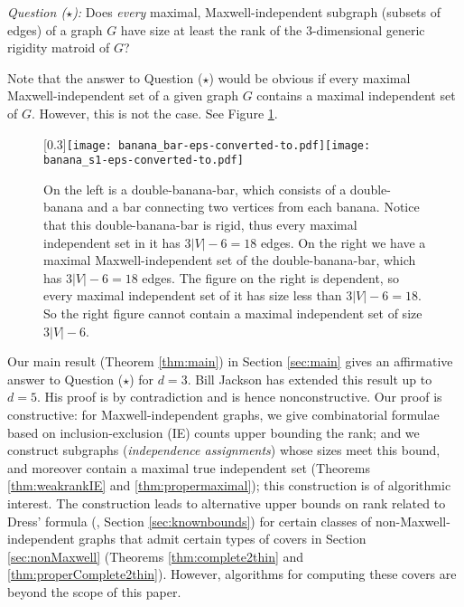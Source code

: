 \documentclass[10pt]{article}
\begin{document}
\medskip
{\em Question ($\star$):}
Does {\it every} maximal, Maxwell-independent subgraph (subsets of edges) of a graph  $G$ have size at least the rank of the $3$-dimensional generic rigidity matroid of $G$?

Note that the answer to Question ($\star$) would be obvious if every maximal Maxwell-independent set of a given graph $G$ contains a maximal independent set of $G$. However, this is not the case. See Figure \ref{fig:bananaBar}.

\begin{center}
\begin{figure}[!h]
\begin{center}
\scalebox{0.3}[0.3]{\texttt{[image: banana\_bar-eps-converted-to.pdf]}\texttt{[image: banana\_s1-eps-converted-to.pdf]} }
\end{center}
\caption{On the left is a double-banana-bar, which consists of a double-banana and a bar connecting two vertices from each banana. Notice that this double-banana-bar is rigid, thus every maximal independent set in it has $3|V|-6=18$ edges. On the right we have a maximal Maxwell-independent set of the double-banana-bar, which has $3|V|-6=18$ edges. The figure on the right is dependent, so every maximal independent set of it has size less than $3|V|-6=18$. So the right figure cannot contain a maximal independent set of size $3|V|-6$. }\label{fig:bananaBar}
\end{figure}
\end{center}

\medskip
\noindent
Our main result (Theorem \ref{thm:main}) in Section \ref{sec:main} gives an affirmative answer to Question ($\star$) for $d=3$. Bill Jackson \cite{JacksonBound2011} has extended this result up to $d=5$. His proof is by contradiction and is hence nonconstructive. Our proof is constructive: for Maxwell-independent graphs, we give combinatorial formulae based on inclusion-exclusion (IE) counts upper bounding the rank; and we construct subgraphs ({\em independence assignments}) whose sizes meet this bound, and moreover contain a maximal true independent set (Theorems \ref{thm:weakrankIE} and \ref{thm:propermaximal}); this construction is of algorithmic interest. The construction leads to alternative upper bounds on rank related to Dress' formula (\cite{bib:Dress}, Section \ref{sec:knownbounds}) for certain classes of non-Maxwell-independent graphs that admit certain types of covers in Section \ref{sec:nonMaxwell} (Theorems \ref{thm:complete2thin} and \ref{thm:properComplete2thin}). However, algorithms for computing these covers are beyond the scope of this paper.
\begin{comment}
it uses Lemma \ref{lem:comb}(\ref{thm:9tree}) which elucidates the structure of a special type of cover that can always be found for Maxwell-independent but
non-Maxwell-rigid graphs. This structure is of independent interest and is exploited (by Proposition \ref{obs:rankIE}) employing a commonly used rank inclusion-exclusion (IE) count. Our best bound (in Theorem \ref{thm:weakrankIE}) is employed in answering both Questions 1 (Theorem \ref{thm:main}) and 2 (Proposition \ref{obs:rankIE} and Theorem \ref{thm:propermaximal}). 
\end{comment}
\end{document}
